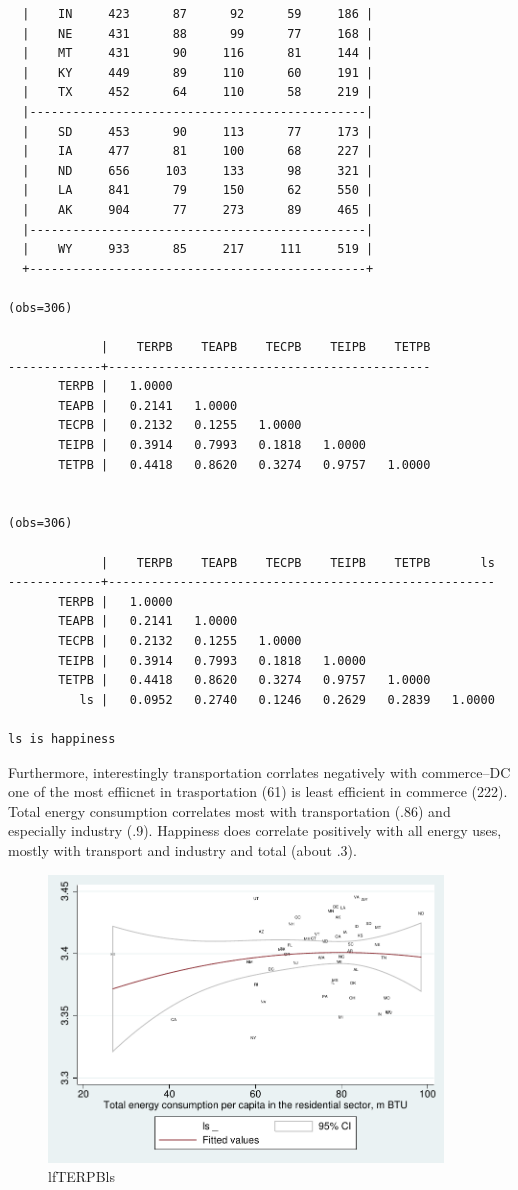 \documentclass[10pt, letterpaper]{article}
\begin{document}
\begin{spacing}{1.4}
\begin{spacing}{.8}
{\begin{verbatim}
  |    IN     423      87      92      59     186 |
  |    NE     431      88      99      77     168 |
  |    MT     431      90     116      81     144 |
  |    KY     449      89     110      60     191 |
  |    TX     452      64     110      58     219 |
  |-----------------------------------------------|
  |    SD     453      90     113      77     173 |
  |    IA     477      81     100      68     227 |
  |    ND     656     103     133      98     321 |
  |    LA     841      79     150      62     550 |
  |    AK     904      77     273      89     465 |
  |-----------------------------------------------|
  |    WY     933      85     217     111     519 |
  +-----------------------------------------------+

(obs=306)

             |    TERPB    TEAPB    TECPB    TEIPB    TETPB
-------------+---------------------------------------------
       TERPB |   1.0000
       TEAPB |   0.2141   1.0000
       TECPB |   0.2132   0.1255   1.0000
       TEIPB |   0.3914   0.7993   0.1818   1.0000
       TETPB |   0.4418   0.8620   0.3274   0.9757   1.0000


(obs=306)

             |    TERPB    TEAPB    TECPB    TEIPB    TETPB       ls
-------------+------------------------------------------------------
       TERPB |   1.0000
       TEAPB |   0.2141   1.0000
       TECPB |   0.2132   0.1255   1.0000
       TEIPB |   0.3914   0.7993   0.1818   1.0000
       TETPB |   0.4418   0.8620   0.3274   0.9757   1.0000
          ls |   0.0952   0.2740   0.1246   0.2629   0.2839   1.0000

ls is happiness
\end{verbatim}
}
\end{spacing}

Furthermore, interestingly transportation corrlates negatively with commerce--DC
one of the most effiicnet in trasportation (61) is least efficient in commerce
(222).  Total energy consumption correlates most with transportation (.86) and
 especially industry (.9). Happiness does correlate positively with all energy
 uses, mostly with transport and industry and total (about .3). 
  

\begin{figure}[H]
 \includegraphics[height=3in]{graphsAndTables/lfTERPBls.pdf}\centering
\caption{lfTERPBls}\label{lfTERPBls}
\end{figure}


\end{spacing}
\end{document}
